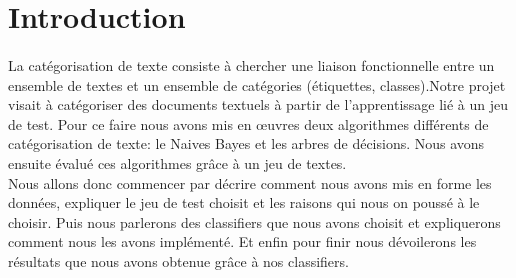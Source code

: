 \newpage
\section*{Introduction}
\paragraph{}
La catégorisation de texte consiste à chercher une liaison fonctionnelle entre un ensemble de textes et un ensemble de catégories (étiquettes, classes).Notre projet visait à catégoriser des documents textuels à partir de l'apprentissage lié à un jeu de test. Pour ce faire nous avons mis en œuvres deux algorithmes différents de catégorisation de texte: le Naives Bayes et les arbres de décisions.  Nous avons ensuite évalué ces algorithmes grâce à un jeu de textes.\\
Nous allons donc commencer par décrire comment nous avons mis en forme les données, expliquer le jeu de test choisit et les raisons qui nous on poussé à le choisir. Puis nous parlerons des classifiers que nous avons choisit et expliquerons comment nous les avons implémenté. Et enfin pour finir nous dévoilerons les résultats que nous avons obtenue grâce à nos classifiers.


\newpage
